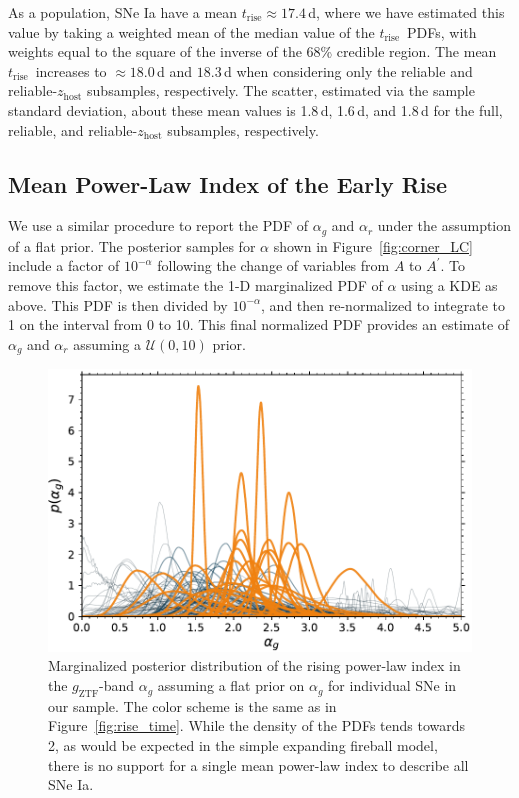 \documentclass[twocolumn]{./aastex63}
\newcommand{\gztf}{$g_\mathrm{ZTF}$}
\newcommand{\trise}{$t_\mathrm{rise}$}
\begin{document}
As a population, SNe Ia have a mean \trise$ \approx 17.4$\,d, where we have
estimated this value by taking a weighted mean of the median value of the
\trise\ PDFs, with weights equal to the square of the inverse of the 68\%
credible region. The mean \trise\ increases to $\approx 18.0$\,d and
$18.3$\,d when considering only the reliable and reliable-$z_\mathrm{host}$
subsamples, respectively. The scatter, estimated via the sample standard
deviation, about these mean values is 1.8\,d, 1.6\,d, and 1.8\,d for the
full, reliable, and reliable-$z_\mathrm{host}$ subsamples, respectively.



\subsection{Mean Power-Law Index of the Early Rise}

We use a similar procedure to report the PDF of $\alpha_g$ and $\alpha_r$ under
the assumption of a flat prior. The posterior samples for $\alpha$ shown in
Figure~\ref{fig:corner_LC} include a factor of $10^{-\alpha}$ following the
change of variables from $A$ to $A^\prime$. To remove this factor, we estimate
the 1-D marginalized PDF of $\alpha$ using a KDE as above. This PDF is then
divided by $10^{-\alpha}$, and then re-normalized to integrate to 1 on the
interval from 0 to 10. This final normalized PDF provides an estimate of
$\alpha_g$ and $\alpha_r$ assuming a $\mathcal{U}(0,10)$ prior.

\begin{figure}
    \centering
    \includegraphics[width=1\linewidth]{./figures/alpha_g.pdf}
    \caption{Marginalized posterior distribution of the rising power-law
    index in the \gztf-band $\alpha_g$ assuming a flat prior on $\alpha_g$
    for individual SNe in our sample. The color scheme is the same as in
    Figure~\ref{fig:rise_time}. While the
    density of the PDFs tends towards 2, as would be expected in the simple
    expanding fireball model, there is no support for a single mean power-law
    index to describe all SNe Ia.}
    \label{fig:alpha_rise}
\end{figure}
\end{document}
